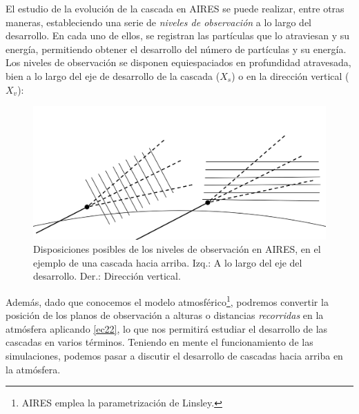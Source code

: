 \documentclass[12 pt, a4paper]{article} %
\numberwithin{equation}{section}
\numberwithin{figure}{section}
\numberwithin{table}{section}
\begin{document}
El estudio de la evolución de la cascada en AIRES se puede realizar, entre otras maneras, estableciendo una serie de \textit{niveles de observación} a lo largo del desarrollo. En cada uno de ellos, se registran las partículas que lo atraviesan y su energía, permitiendo obtener el desarrollo del número de partículas y su energía. Los niveles de observación se disponen equiespaciados en profundidad atravesada, bien a lo largo del eje de desarrollo de la cascada ($X_s$) o en la dirección vertical ($X_v$):
\clearpage
	\begin{figure}[H]
		\centering
		\includegraphics[width=.6\linewidth]{figures/cascadas/AIRES_planos}
		\caption{Disposiciones posibles de los niveles de observación en AIRES, en el ejemplo de una cascada hacia arriba. Izq.: A lo largo del eje del desarrollo. Der.: Dirección vertical.}
		\label{AIRES_planos}
	\end{figure}
	
Además, dado que conocemos el modelo atmosférico\footnote{ AIRES emplea la parametrización de Linsley.}, podremos convertir la posición de los planos de observación a alturas o distancias \textit{recorridas} en la atmósfera aplicando \eqref{ec22}, lo que nos permitirá estudiar el desarrollo de las cascadas en varios términos. Teniendo en mente el funcionamiento de las simulaciones, podemos pasar a discutir el desarrollo de cascadas hacia arriba en la atmósfera.
\end{document}

